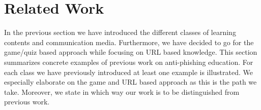 
\section{Related Work}
\label{s:related_work}
In the previous section we have introduced the different classes of learning contents and communication media. 
Furthermore, we have decided to go for the game/quiz based approach while focusing on URL based knowledge. 
This section summarizes concrete examples of previous work on anti-phishing education.
For each class we have previously introduced at least one example is illustrated. 
We especially elaborate on the game and URL based approach as this is the path we take. 
Moreover, we state in which way our work is to be distinguished from previous work. 

